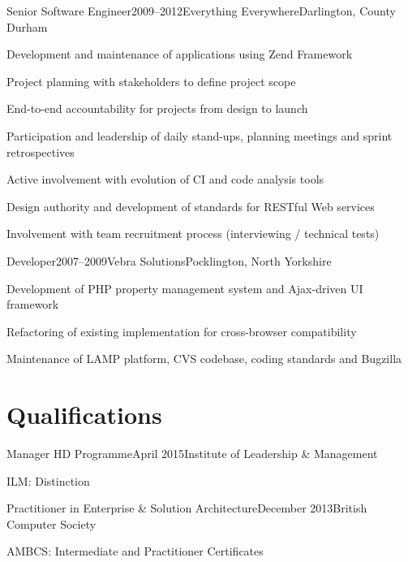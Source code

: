 \documentclass{cv}
\begin{document}
\begin{experience}{Senior Software Engineer}{2009--2012}{Everything Everywhere}{Darlington, County Durham}
\item Development and maintenance of applications using Zend Framework
\item Project planning with stakeholders to define project scope
\item End-to-end accountability for projects from design to launch
\item Participation and leadership of daily stand-ups, planning meetings and sprint retrospectives
\item Active involvement with evolution of CI and code analysis tools
\item Design authority and development of standards for RESTful Web services
\item Involvement with team recruitment process (interviewing / technical tests)
\end{experience}


\begin{experience}{Developer}{2007--2009}{Vebra Solutions}{Pocklington, North Yorkshire}
\item Development of PHP property management system and Ajax-driven UI framework
\item Refactoring of existing implementation for cross-browser compatibility
\item Maintenance of LAMP platform, CVS codebase, coding standards and Bugzilla
\end{experience}


\section{Qualifications}

\begin{experience}{Manager HD Programme}{April 2015}{Institute of Leadership \& Management}{}
\item ILM: Distinction
\end{experience}

\begin{experience}{Practitioner in Enterprise \& Solution Architecture}{December 2013}{British Computer Society}{}
\item AMBCS: Intermediate and Practitioner Certificates
\end{experience}
\end{document}
